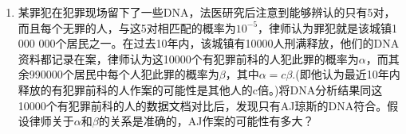 \documentclass[12pt]{article}
\newcommand{\hei}{\CJKfamily{hei}}                          %
\begin{document}
\begin{enumerate}
\item {\hei 某罪犯在犯罪现场留下了一些DNA，法医研究后注意到能够辨认的只有5对，而且每个无罪的人，与这5对相匹配的概率为$10^{-5}$，律师认为罪犯就是该城镇1 000 000个居民之一。在过去10年内，该城镇有10000人刑满释放，他们的DNA资料都记录在案，律师认为这10000个有犯罪前科的人犯此罪的概率为$\alpha$，而其余990000个居民中每个人犯此罪的概率为$\beta$，其中$\alpha=c\beta$.(即他认为最近10年内释放的有犯罪前科的人作案的可能性是其他人的c倍。)将DNA分析结果同这10000个有犯罪前科的人的数据文档对比后，发现只有AJ琼斯的DNA符合。假设律师关于$\alpha$和$\beta$的关系是准确的，AJ作案的可能性有多大？}


\end{enumerate}
\end{document}
